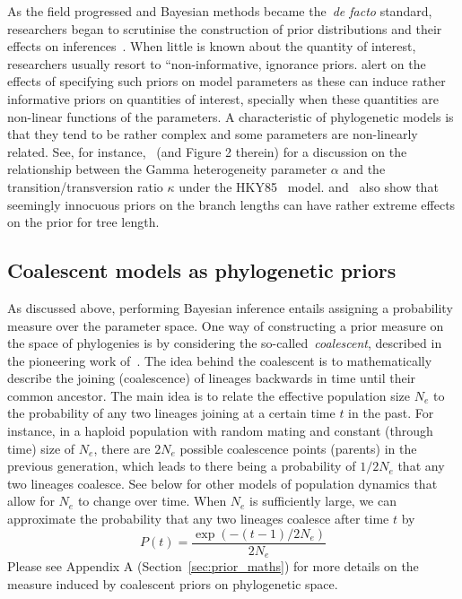 As the field progressed and Bayesian methods became the~\textit{de facto} standard, researchers began to scrutinise the construction of prior distributions and their effects 
on inferences~\citep{Huelsenbeck2002,Yang2005,Alfaro2006}.
When little is known about the quantity of interest, researchers usually resort to ``non-informative, ignorance priors.
\cite{Seaman2012} alert on the effects of specifying such priors on model parameters as these can induce rather informative priors on quantities of interest, specially when these quantities are non-linear functions of the parameters.
A characteristic of phylogenetic models is that they tend to be rather complex and some parameters are non-linearly related.
See, for instance,~\cite{Yang1996} (and Figure 2 therein) for a discussion on the relationship between the Gamma heterogeneity parameter $\alpha$ and the transition/transversion ratio $\kappa$ under the HKY85~\citep{Hasegawa1985} model.
\cite{Rannala2012} and~\cite{Wang2014} also show that seemingly innocuous priors on the branch lengths can have rather extreme effects on the prior for tree length.


\subsection{Coalescent models as phylogenetic priors}
\label{sec:coalescent_priors}

As discussed above, performing Bayesian  inference entails assigning a probability measure over the parameter space.
One way of constructing a prior measure on the space of phylogenies is by considering the so-called~\textit{coalescent}, described in the pioneering work of~\cite{Kingman1982}.
The idea behind the coalescent is to mathematically describe the joining (coalescence) of lineages backwards in time until their common ancestor.
The main idea is to relate the effective population size $N_e$ to the probability of any two lineages joining at a certain time $t$ in the past.
For instance, in a haploid population with random mating and constant (through time) size of $N_e$, there are $2N_e$ possible coalescence points (parents) in the previous generation, which leads to there being a probability of $1/2N_e$ that any two lineages coalesce.
See below for other models of population dynamics that allow for $N_e$ to change over time.
When $N_e$ is sufficiently large, we can approximate the probability that any two lineages coalesce after time $t$ by
$$ P(t) = \frac{\exp\left( -(t-1)/2N_e\right)}{2N_e}  $$
Please see Appendix A (Section~\ref{sec:prior_maths}) for more details on the measure induced by coalescent priors on phylogenetic space.

